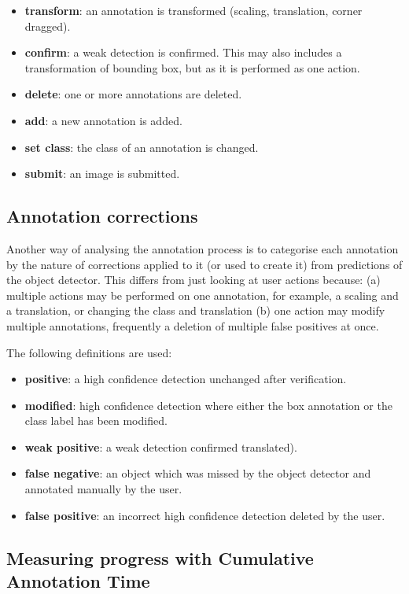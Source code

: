 \begin{itemize}
    \item {\bf transform}: an annotation is transformed (scaling, translation, corner dragged).
    \item {\bf confirm}: a weak detection is confirmed. This may also includes a transformation of bounding box, but as it is performed as one action.
    \item {\bf delete}: one or more annotations are deleted.
    \item {\bf add}: a new annotation is added.
    \item {\bf set class}: the class of an annotation is changed.    
    \item {\bf submit}: an image is submitted.    
\end{itemize}

\subsection{Annotation corrections}
\label{sec:corrections}

Another way of analysing the annotation process is to categorise each annotation by the nature of corrections applied to it (or used to create it) from predictions of the object detector. This differs from just looking at user actions because: (a) multiple actions may be performed on one annotation, for example, a scaling and a translation, or changing the class and translation (b) one action may modify multiple annotations, frequently a deletion of multiple false positives at once.

The following definitions are used:

\begin{itemize}
    \item {\bf positive}: a high confidence detection unchanged after verification.
    \item {\bf modified}: high confidence detection where either the box annotation or the class label has been modified.
    \item {\bf weak positive}: a weak detection confirmed translated).    
    \item {\bf false negative}: an object which was missed by the object detector and annotated manually by the user.    
    \item {\bf false positive}: an incorrect high confidence detection deleted by the user.
\end{itemize}

\subsection{Measuring progress with Cumulative Annotation Time}
\label{sec:ann_time}

